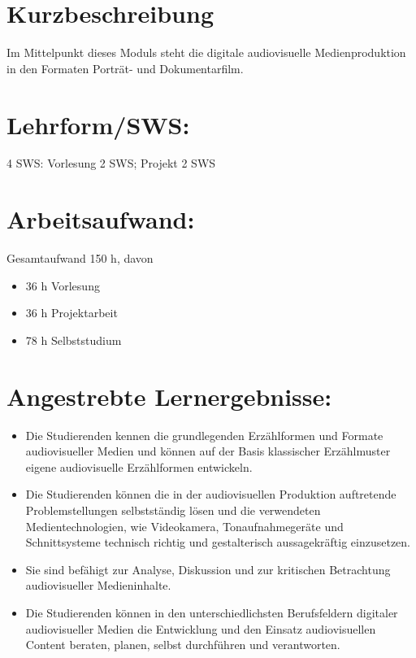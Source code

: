 \section*{Kurzbeschreibung}\label{kurzbeschreibung}

Im Mittelpunkt dieses Moduls steht die digitale audiovisuelle
Medienproduktion in den Formaten Porträt- und Dokumentarfilm.

\section*{Lehrform/SWS:}\label{lehrformsws-2}

4 SWS: Vorlesung 2 SWS; Projekt 2 SWS

\section*{Arbeitsaufwand:}\label{arbeitsaufwand-2}

Gesamtaufwand 150 h, davon

\begin{itemize}
\tightlist
\item
  36 h Vorlesung
\item
  36 h Projektarbeit
\item
  78 h Selbststudium
\end{itemize}

\section*{Angestrebte
Lernergebnisse:}\label{angestrebte-lernergebnisse-2}

\begin{itemize}
\tightlist
\item
  Die Studierenden kennen die grundlegenden Erzählformen und Formate
  audiovisueller Medien und können auf der Basis klassischer
  Erzählmuster eigene audiovisuelle Erzählformen entwickeln.
\item
  Die Studierenden können die in der audiovisuellen Produktion
  auftretende Problemstellungen selbstständig lösen und die verwendeten
  Medientechnologien, wie Videokamera, Tonaufnahmegeräte und
  Schnittsysteme technisch richtig und gestalterisch aussagekräftig
  einzusetzen.
\item
  Sie sind befähigt zur Analyse, Diskussion und zur kritischen
  Betrachtung audiovisueller Medieninhalte.
\item
  Die Studierenden können in den unterschiedlichsten Berufsfeldern
  digitaler audiovisueller Medien die Entwicklung und den Einsatz
  audiovisuellen Content beraten, planen, selbst durchführen und
  verantworten.
\end{itemize}

